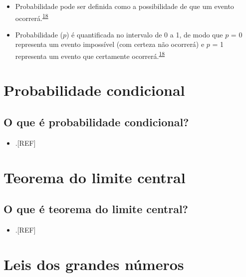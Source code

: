 \documentclass[
]{book}
\providecommand{\tightlist}{%
  \setlength{\itemsep}{0pt}\setlength{\parskip}{0pt}}
\begin{document}
\begin{itemize}
\item
  Probabilidade pode ser definida como a possibilidade de que um evento ocorrerá.\textsuperscript{\protect\hyperlink{ref-Ali2016}{18}}
\item
  Probabilidade (\(p\)) é quantificada no intervalo de 0 a 1, de modo que \(p\) = 0 representa um evento impossível (com certeza não ocorrerá) e \(p\) = 1 representa um evento que certamente ocorrerá.\textsuperscript{\protect\hyperlink{ref-Ali2016}{18}}
\end{itemize}

\hypertarget{probabilidade-ciondicional}{%
\section{Probabilidade condicional}\label{probabilidade-ciondicional}}

\hypertarget{o-que-uxe9-probabilidade-condicional}{%
\subsection{O que é probabilidade condicional?}\label{o-que-uxe9-probabilidade-condicional}}

\begin{itemize}
\tightlist
\item
  .{[}REF{]}
\end{itemize}

\hypertarget{teorema-limite-central}{%
\section{Teorema do limite central}\label{teorema-limite-central}}

\hypertarget{o-que-uxe9-teorema-do-limite-central}{%
\subsection{O que é teorema do limite central?}\label{o-que-uxe9-teorema-do-limite-central}}

\begin{itemize}
\tightlist
\item
  .{[}REF{]}
\end{itemize}

\hypertarget{lei-grandes-numeros}{%
\section{Leis dos grandes números}\label{lei-grandes-numeros}}
\end{document}
